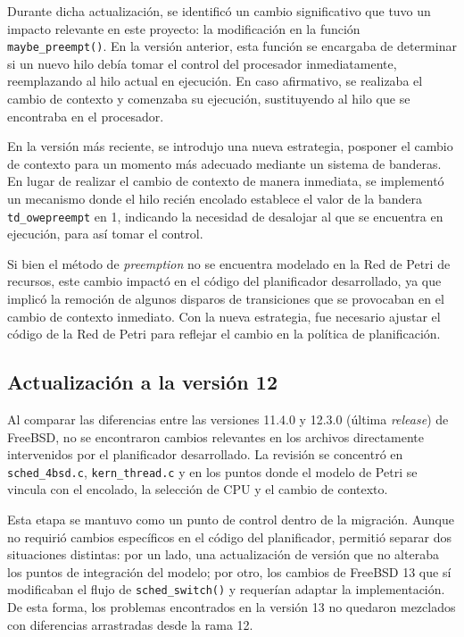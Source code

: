 Durante dicha actualización, se identificó un cambio significativo que tuvo un impacto relevante en este proyecto: la modificación en la función \verb|maybe_preempt()|. En la versión anterior, esta función se encargaba de determinar si un nuevo hilo debía tomar el control del procesador inmediatamente, reemplazando al hilo actual en ejecución. En caso afirmativo, se realizaba el cambio de contexto y comenzaba su ejecución, sustituyendo al hilo que se encontraba en el procesador.\par

En la versión más reciente, se introdujo una nueva estrategia, posponer el cambio de contexto para un momento más adecuado mediante un sistema de banderas. En lugar de realizar el cambio de contexto de manera inmediata, se implementó un mecanismo donde el hilo recién encolado establece el valor de la bandera \verb|td_owepreempt| en 1, indicando la necesidad de desalojar al que se encuentra en ejecución, para así tomar el control.\par

Si bien el método de \textit{preemption} no se encuentra modelado en la Red de Petri de recursos, este cambio impactó en el código del planificador desarrollado, ya que implicó la remoción de algunos disparos de transiciones que se provocaban en el cambio de contexto inmediato. Con la nueva estrategia, fue necesario ajustar el código de la Red de Petri para reflejar el cambio en la política de planificación.\par

\subsection{Actualización a la versión 12}

Al comparar las diferencias entre las versiones 11.4.0 y 12.3.0 (última \textit{release}) de FreeBSD, no se encontraron cambios relevantes en los archivos directamente intervenidos por el planificador desarrollado. La revisión se concentró en \verb|sched_4bsd.c|, \verb|kern_thread.c| y en los puntos donde el modelo de Petri se vincula con el encolado, la selección de CPU y el cambio de contexto.\par

Esta etapa se mantuvo como un punto de control dentro de la migración. Aunque no requirió cambios específicos en el código del planificador, permitió separar dos situaciones distintas: por un lado, una actualización de versión que no alteraba los puntos de integración del modelo; por otro, los cambios de FreeBSD 13 que sí modificaban el flujo de \verb|sched_switch()| y requerían adaptar la implementación. De esta forma, los problemas encontrados en la versión 13 no quedaron mezclados con diferencias arrastradas desde la rama 12.\par


